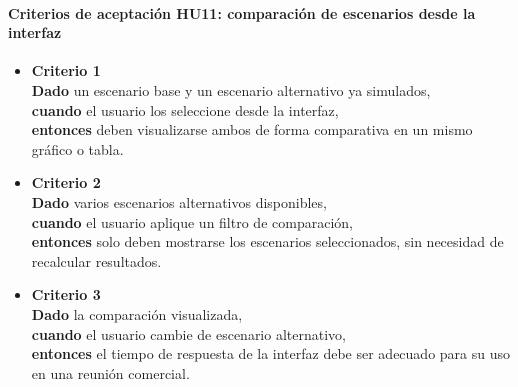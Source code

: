 \documentclass[
11pt, %
]{charter}
\begin{document}
\paragraph{Criterios de aceptación HU11: comparación de escenarios desde la interfaz}
\begin{itemize}
  \item \textbf{Criterio 1} \\
  \textbf{Dado} un escenario base y un escenario alternativo ya simulados, \\
  \textbf{cuando} el usuario los seleccione desde la interfaz, \\
  \textbf{entonces} deben visualizarse ambos de forma comparativa en un mismo gráfico o tabla.

  \item \textbf{Criterio 2} \\
  \textbf{Dado} varios escenarios alternativos disponibles, \\
  \textbf{cuando} el usuario aplique un filtro de comparación, \\
  \textbf{entonces} solo deben mostrarse los escenarios seleccionados, sin necesidad de recalcular resultados.

  \item \textbf{Criterio 3} \\
  \textbf{Dado} la comparación visualizada, \\
  \textbf{cuando} el usuario cambie de escenario alternativo, \\
  \textbf{entonces} el tiempo de respuesta de la interfaz debe ser adecuado para su uso en una reunión comercial.
\end{itemize}

\vspace{1em}
\end{document}
